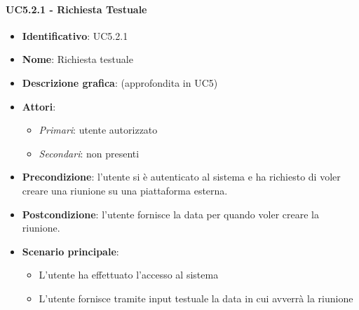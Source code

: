 \paragraph{UC5.2.1 - Richiesta Testuale}
\begin{itemize}
   \item \textbf{Identificativo}: UC5.2.1
   \item \textbf{Nome}: Richiesta testuale
   \item \textbf{Descrizione grafica}: (approfondita in UC5)
   \item \textbf{Attori}:
   \begin{itemize} 
       \item \textit{Primari}: utente autorizzato
       \item \textit{Secondari}: non presenti
   \end{itemize}
       \item \textbf{Precondizione}: l'utente si è autenticato al sistema e ha richiesto di voler creare una riunione su una piattaforma esterna.
       \item \textbf{Postcondizione}: l'utente fornisce la data per quando voler creare la riunione.
    \item \textbf{Scenario principale}: 
       \begin{itemize}
           \item L'utente ha effettuato l'accesso al sistema 
           \item L'utente fornisce tramite input testuale la data in cui avverrà la riunione
       \end{itemize}
\end{itemize}

